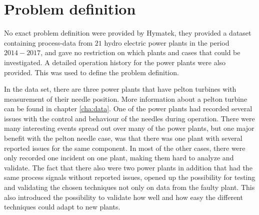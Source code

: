 

\section{Problem definition}


No exact problem definition were provided by Hymatek, they provided a dataset containing process-data from $21$ hydro electric power plants in the period $2014-2017$, and gave no restriction on which plants and cases that could be investigated. A detailed operation history for the power plants were also provided. This was used to define the problem definition.  

In the data set, there are three power plants that have pelton turbines with measurement of their needle position. More information about a pelton turbine can be found in chapter \ref{cha:data}. One of the power plants had recorded several issues with the control and behaviour of the needles during operation. There were many interesting events spread out over many of the power plants, but one major benefit with the pelton needle case, was that there was one plant with several reported issues for the same component. In most of the other cases, there were only recorded one incident on one plant, making them hard to analyze and validate. The fact that there also were two power plants in addition that had the same process signals without reported issues, opened up the possibility for testing and validating the chosen techniques not only on data from the faulty plant. This also introduced the possibility to validate how well and how easy the different techniques could adapt to new plants.    

